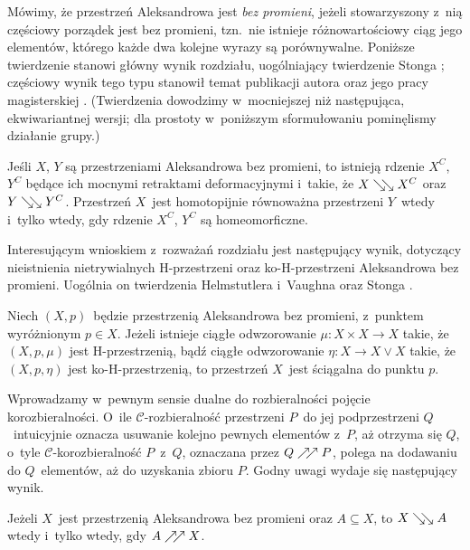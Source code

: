 Mówimy, że przestrzeń Aleksandrowa jest \textit{bez promieni}, jeżeli stowarzyszony z~nią częściowy porządek jest bez promieni, tzn.~nie istnieje różnowartościowy ciąg jego elementów, którego każde dwa kolejne wyrazy są porównywalne. Poniższe twierdzenie stanowi główny wynik rozdziału, uogólniający twierdzenie Stonga \cite[Theorem 4]{Stong66}; częściowy wynik tego typu stanowił temat publikacji autora \cite{Kukiela10a} oraz jego pracy magisterskiej \cite{Kukiela10}. (Twierdzenia dowodzimy w~mocniejszej niż następująca, ekwiwariantnej wersji; dla prostoty w~poniższym sformułowaniu pominęlismy działanie grupy.)

\begin{tw*}[\ref{wniosek_klasyfikacyjny}]
Jeśli $X$, $Y$ są przestrzeniami Aleksandrowa bez promieni, to istnieją rdzenie $X^C$, $Y^C$ będące ich mocnymi retraktami deformacyjnymi i~takie, że $X\searrow\!\!\searrow X^C$ oraz $Y\searrow\!\!\searrow Y^C$. Przestrzeń $X$~jest homotopijnie równoważna przestrzeni $Y$~wtedy i~tylko wtedy, gdy rdzenie $X^C$, $Y^C$ są homeomorficzne. 
\end{tw*}

Interesującym wnioskiem z~rozważań rozdziału jest następujący wynik, dotyczący nieistnienia nietrywialnych H-przestrzeni oraz ko-H-przestrzeni Aleksandrowa bez promieni. Uogólnia on twierdzenia Helmstutlera i~Vaughna \cite[Theorem 8]{Helmstutler10} oraz Stonga \cite[Section 5]{Stong66}.

\begin{stw*}[\ref{stw-stonga_o_h_przestrzeniach}, \ref{stw-helmsutlera-vaughna}]
Niech $(X,p)$~będzie przestrzenią Aleksandrowa bez promieni, z~punktem wyróżnionym $p\in X$. Jeżeli istnieje ciągłe odwzorowanie \mbox{$\mu:X\times X\to X$} takie, że $(X,p,\mu)$ jest \mbox{H-przestrzenią}, bądź ciągłe odwzorowanie \mbox{$\eta\colon X\to X\vee X$} takie, że $(X,p,\eta)$ jest ko-H-przestrzenią, to przestrzeń $X$~jest ściągalna do punktu $p$.
\end{stw*}

Wprowadzamy w~pewnym sensie dualne do rozbieralności pojęcie korozbieralności. O~ile \mbox{$\mathcal{C}$-rozbieralność} przestrzeni $P$~do jej podprzestrzeni $Q$~intuicyjnie oznacza usuwanie kolejno pewnych elementów z~$P$, aż otrzyma się $Q$, o~tyle \mbox{$\mathcal{C}$-korozbieralność} $P$~z~$Q$, oznaczana przez $Q\nearrow\!\!\nearrow P$, polega na dodawaniu do $Q$~elementów, aż do uzyskania zbioru $P$. Godny uwagi wydaje się następujący wynik.

\begin{tw*}[\ref{build_if_dism}]
Jeżeli $X$~jest przestrzenią Aleksandrowa bez promieni oraz \mbox{$A\subseteq X$}, to $X\searrow\!\!\searrow A$ wtedy i~tylko wtedy, gdy $A\nearrow\!\!\nearrow X$.
\end{tw*}

